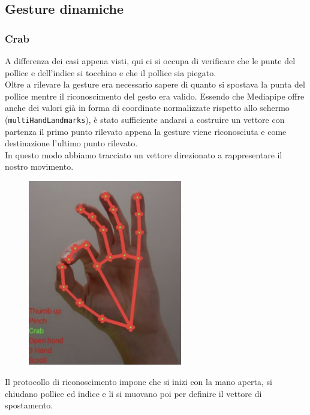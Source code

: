 \subsection{Gesture dinamiche}

\subsubsection{Crab}
A differenza dei casi appena visti, qui ci si occupa di verificare che le punte del pollice e dell'indice si tocchino e che il pollice sia piegato.\\
Oltre a rilevare la gesture era necessario sapere di quanto si spostava la punta del pollice mentre il riconoscimento del gesto era valido. 
Essendo che Mediapipe offre anche dei valori già in forma di coordinate normalizzate rispetto allo schermo (\texttt{multiHandLandmarks}), è stato sufficiente andarsi a costruire un vettore con partenza il primo punto rilevato appena la gesture viene riconosciuta e come destinazione l'ultimo punto rilevato.\\
In questo modo abbiamo tracciato un vettore direzionato a rappresentare il nostro movimento.
\begin{figure}[H]
    \centering
    \includegraphics[width=0.6\textwidth]{images/crab.png}
\end{figure}
\noindent Il protocollo di riconoscimento impone che si inizi con la mano aperta, si chiudano pollice ed indice e li si muovano poi per definire il vettore di spostamento.

\newpage
